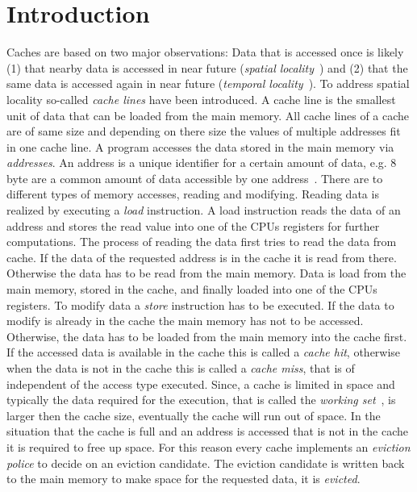 \documentclass[onecolumn, openright, master, english, signatures]{dbrgrptt}
\begin{document}
\chapter{Introduction}\label{cha:introduction}
Caches are based on two major observations: Data that is accessed once is likely (1) that nearby data is accessed in near future (\emph{spatial locality}~\cite{jacob2010memory}) and (2) that the same data is accessed again in near future (\emph{temporal locality}~\cite{jacob2010memory}).
To address spatial locality so-called \emph{cache lines} have been introduced.
A cache line is the smallest unit of data that can be loaded from the main memory.
All cache lines of a cache are of same size and depending on there size the values of multiple addresses fit in one cache line.
A program accesses the data stored in the main memory via \emph{addresses}.
An address is a unique identifier for a certain amount of data, e.g. 8 byte are a common amount of data accessible by one address~\cite{patterson2011computer}.
%
There are to different types of memory accesses, reading and modifying.
Reading data is realized by executing a \emph{load} instruction.
A load instruction reads the data of an address and stores the read value into one of the \ac{CPU}s registers for further computations.
The process of reading the data first tries to read the data from cache.
If the data of the requested address is in the cache it is read from there.
Otherwise the data has to be read from the main memory.
Data is load from the main memory, stored in the cache, and finally loaded into one of the \ac{CPU}s registers.
To modify data a \emph{store} instruction has to be executed.
If the data to modify is already in the cache the main memory has not to be accessed.
Otherwise, the data has to be loaded from the main memory into the cache first.
If the accessed data is available in the cache this is called a \emph{cache hit}, otherwise when the data is not in the cache this is called a \emph{cache miss}, that is of independent of the access type executed.
%
Since, a cache is limited in space and typically the data required for the execution, that is called the \emph{working set}~\cite{denning1968working}, is larger then the cache size, eventually the cache will run out of space.
In the situation that the cache is full and an address is accessed that is not in the cache it is required to free up space.
For this reason every cache implements an \emph{eviction police} to decide on an eviction candidate.
The eviction candidate is written back to the main memory to make space for the requested data, it is \emph{evicted}.
\end{document}
